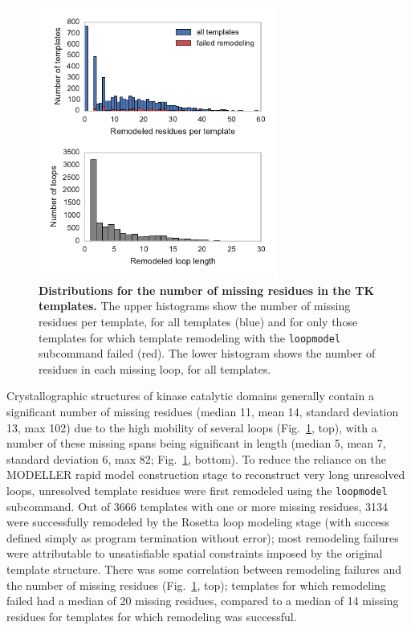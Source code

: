 \documentclass[aps,prl,preprint,nofootinbib,superscriptaddress,linenumbers]{revtex4-1}
\begin{document}
\begin{figure}[tbp]
    \includegraphics[width=0.7\textwidth]{loopmodel_analysis/nmissing_resis_distributions.pdf}
    \caption{\footnotesize {\bf Distributions for the number of missing residues in the TK templates.}
    The upper histograms show the number of missing residues per template, for all templates (blue) and for only those templates for which template remodeling with the {\tt loopmodel} subcommand failed (red).
    The lower histogram shows the number of residues in each missing loop, for all templates.
}
    \label{figure:loopmodel-nmissing-residues}
\end{figure}

Crystallographic structures of kinase catalytic domains generally contain a significant number of missing residues (median 11, mean 14, standard deviation 13, max 102) due to the high mobility of several loops (Fig.~\ref{figure:loopmodel-nmissing-residues}, top), with a number of these missing spans being significant in length (median 5, mean 7, standard deviation 6, max 82; Fig.~\ref{figure:loopmodel-nmissing-residues}, bottom).
To reduce the reliance on the MODELLER rapid model construction stage to reconstruct very long unresolved loops, unresolved template residues were first remodeled using the {\tt loopmodel} subcommand.
Out of \num{3666} templates with one or more missing residues, \num{3134} were successfully remodeled by the Rosetta loop modeling stage (with success defined simply as program termination without error); most remodeling failures were attributable to unsatisfiable spatial constraints imposed by the original template structure.
There was some correlation between remodeling failures and the number of missing residues (Fig.~\ref{figure:loopmodel-nmissing-residues}, top); templates for which remodeling failed had a median of 20 missing residues, compared to a median of 14 missing residues for templates for which remodeling was successful.
\end{document}
